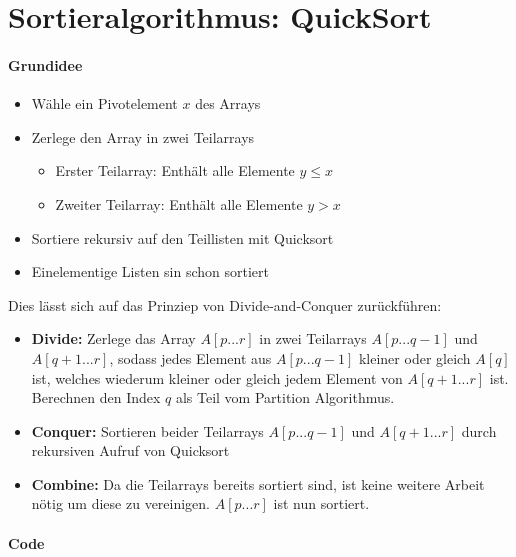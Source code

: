 \vspace{1.5cm}
\section{Sortieralgorithmus: QuickSort} %

	\paragraph{Grundidee}
	\begin{itemize}
		\item Wähle ein Pivotelement $x$ des Arrays
		\item Zerlege den Array in zwei Teilarrays
		\begin{itemize}
			\item Erster Teilarray: Enthält alle Elemente $y \leq x$
			\item Zweiter Teilarray: Enthält alle Elemente $y > x$ 
		\end{itemize}
		\item Sortiere rekursiv auf den Teillisten mit Quicksort
		\item Einelementige Listen sin schon sortiert
	\end{itemize}

	Dies lässt sich auf das Prinziep von Divide-and-Conquer zurückführen:

	\begin{itemize}
		\item \textbf{Divide:} Zerlege das Array $A[p...r]$ in zwei Teilarrays $A[p...q-1]$ 
			und $A[q+1...r]$, sodass jedes Element aus $A[p...q-1]$ kleiner oder gleich $A[q]$
			ist, welches wiederum kleiner oder gleich jedem Element von $A[q+1...r]$ ist. 
			Berechnen den Index $q$ als Teil vom Partition Algorithmus.
		\item \textbf{Conquer:} Sortieren beider Teilarrays $A[p...q-1]$ und $A[q+1...r]$ durch
			rekursiven Aufruf von Quicksort
		\item \textbf{Combine:} Da die Teilarrays bereits sortiert sind, ist keine weitere Arbeit
			nötig um diese zu vereinigen. $A[p...r]$ ist nun sortiert. 
	\end{itemize}



	\paragraph{Code} \mbox{} \\

